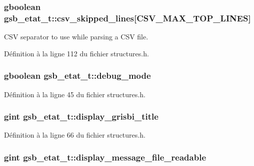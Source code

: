 \subsubsection[{csv\_\-skipped\_\-lines}]{\setlength{\rightskip}{0pt plus 5cm}gboolean {\bf gsb\_\-etat\_\-t::csv\_\-skipped\_\-lines}[CSV\_\-MAX\_\-TOP\_\-LINES]}\label{structgsb__etat__t_a51653cc807d6160d6ad2f65666026a68}
CSV separator to use while parsing a CSV file. 

Définition à la ligne 112 du fichier structures.h.

\subsubsection[{debug\_\-mode}]{\setlength{\rightskip}{0pt plus 5cm}gboolean {\bf gsb\_\-etat\_\-t::debug\_\-mode}}\label{structgsb__etat__t_a34dce90a505d952d0fad5ec91297cd9a}


Définition à la ligne 45 du fichier structures.h.

\subsubsection[{display\_\-grisbi\_\-title}]{\setlength{\rightskip}{0pt plus 5cm}gint {\bf gsb\_\-etat\_\-t::display\_\-grisbi\_\-title}}\label{structgsb__etat__t_a568b1677ab2a0bf755b7668eaf523418}


Définition à la ligne 66 du fichier structures.h.

\subsubsection[{display\_\-message\_\-file\_\-readable}]{\setlength{\rightskip}{0pt plus 5cm}gint {\bf gsb\_\-etat\_\-t::display\_\-message\_\-file\_\-readable}}\label{structgsb__etat__t_aa01847b45365b4a9be899d2c9f7764aa}


